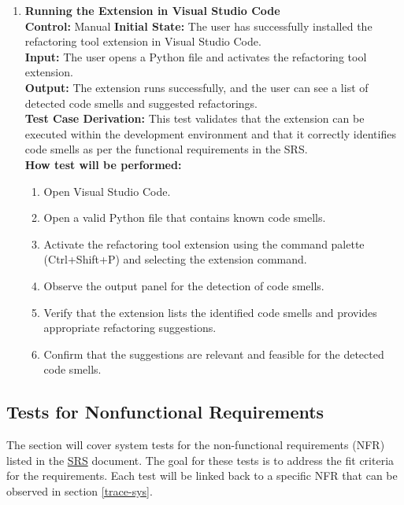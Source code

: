 \documentclass[12pt, titlepage]{article}
\newcommand{\SRS}{\href{https://github.com/ssm-lab/capstone--source-code-optimizer/blob/main/docs/SRS/SRS.pdf}{SRS}}
\begin{document}
\begin{enumerate}[label={\bf \textcolor{Maroon}{test-FR-IE-\arabic*}}, wide=0pt, font=\itshape]
  \item \textbf{Running the Extension in Visual Studio Code}\\[2mm]
    \textbf{Control:} Manual
    \textbf{Initial State:} The user has successfully installed the refactoring tool extension in Visual Studio Code.\\
    \textbf{Input:} The user opens a Python file and activates the refactoring tool extension.\\
    \textbf{Output:} The extension runs successfully, and the user can see a list of detected code smells and suggested refactorings.\\[2mm]
    \textbf{Test Case Derivation:} This test validates that the extension can be executed within the development environment and that it correctly identifies code smells as per the functional requirements in the SRS.\\[2mm]
    \textbf{How test will be performed:}
    \begin{enumerate}[label=\arabic*.]
        \item Open Visual Studio Code.
        \item Open a valid Python file that contains known code smells.
        \item Activate the refactoring tool extension using the command palette (Ctrl+Shift+P) and selecting the extension command.
        \item Observe the output panel for the detection of code smells.
        \item Verify that the extension lists the identified code smells and provides appropriate refactoring suggestions.
        \item Confirm that the suggestions are relevant and feasible for the detected code smells.
    \end{enumerate}
\end{enumerate}

\subsection{Tests for Nonfunctional Requirements}

The section will cover system tests for the non-functional requirements (NFR) listed in the \SRS \hspace{1pt} document\cite{SRS}. The goal for these tests is to address the fit criteria for the requirements. Each test will be linked back to a specific NFR that can be observed in section \ref{trace-sys}.
\end{document}
